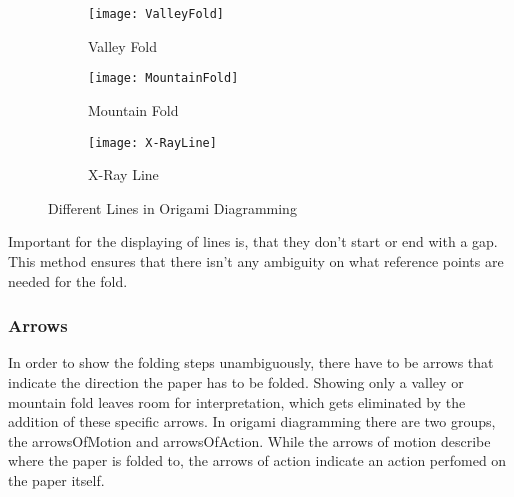 \begin{figure*}[h]
    \centering
    \begin{subfigure}[b]{0.3\textwidth}
        \texttt{[image: ValleyFold]}
        \caption{Valley Fold}
        \label{fig:valleyFold}
    \end{subfigure}
    \begin{subfigure}[b]{0.3\textwidth}
        \texttt{[image: MountainFold]}
        \caption{Mountain Fold}
        \label{fig:mountainFold}
    \end{subfigure}
    \begin{subfigure}[b]{0.3\textwidth}
        \texttt{[image: X-RayLine]}
        \caption{X-Ray Line}
        \label{fig:x-rayLine}
    \end{subfigure}
    \caption{Different Lines in Origami Diagramming}\label{fig:origamiLines}
\end{figure*}

Important for the displaying of lines is, that they don't start or end with a gap. This method ensures that there isn't any ambiguity on what reference points are needed for the fold.


\subsubsection{Arrows}
\label{sec:arrows}

In order to show the folding steps unambiguously, there have to be arrows that indicate the direction the paper has to be folded. Showing only a valley or mountain fold leaves room for interpretation, which gets eliminated by the addition of these specific arrows. In origami diagramming there are two groups, the \gls{arrowsOfMotion} and \gls{arrowsOfAction}.
While the arrows of motion describe where the paper is folded to, the arrows of action indicate an action perfomed on the paper itself.

